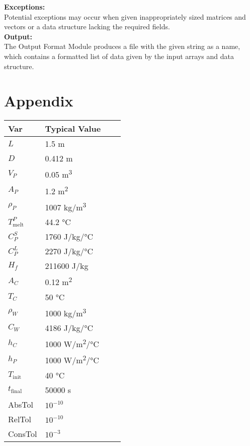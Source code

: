 \documentclass[12pt]{article}
\begin{document}
\noindent \textbf{Exceptions:}\\
Potential exceptions may occur when given inappropriately sized
matrices and vectors or a data structure lacking the required fields.\\

\noindent \textbf{Output:}\\
The Output Format Module produces a file with the given string as a name, which contains a formatted list of data given by the input arrays and data structure.


\section{Appendix}
\begin{table}[!h]
\caption{Standard Input Variables} \label{TblInputVar}
\renewcommand{\arraystretch}{1.2}
\noindent \begin{longtable*}{l l l c} 
  \toprule
  \textbf{Var} & \textbf{Typical Value}\\
  \midrule 
  $L$	& 1.5 \si[per-mode=symbol]	{\metre}
  \\
  $D$	& 0.412 \si[per-mode=symbol] {\metre}	
  \\
  $V_P$ & 0.05 \si[per-mode=symbol] {\cubic\metre}	
  \\
  $A_P$ & 1.2 \si[per-mode=symbol] {\square\metre}	
  \\
  $\rho_P$ & 1007 \si[per-mode=symbol] {\kilogram\per\cubic\metre}
  \\
  $T_\text{melt}^{P}$ &	44.2 \si[per-mode=symbol] {\celsius} 
  \\
  $C_P^S$ & 1760 \si[per-mode=symbol] {\joule\per\kilo\gram\per\celsius}
  \\
  $C_P^L$ & 2270 \si[per-mode=symbol] {\joule\per\kilo\gram\per\celsius} 
  \\
  $H_f$ & 211600 \si[per-mode=symbol] {\joule\per\kilo\gram} & 
  \\
  $A_C$ & 0.12 \si[per-mode=symbol] {\square\metre}
  \\
  $T_C$	& 50 \si[per-mode=symbol] {\celsius}
  \\
  $\rho_W$ & 1000 \si[per-mode=symbol] {\kilo\gram\per\cubic\metre} 
  \\
  $C_W$ & 4186 \si[per-mode=symbol] {\joule\per\kilo\gram\per\celsius}
  \\
  $h_C$ & 1000 \si[per-mode=symbol] {\watt\per\square\metre\per\celsius}
  \\
  $h_P$ & 1000 \si[per-mode=symbol] {\watt\per\square\metre\per\celsius} 
  \\
  $T_\text{init}$ & 40 \si[per-mode=symbol] {\celsius} 
  \\
  $t_\text{final}$ & 50000 \si[per-mode=symbol] {\second} 
  \\
  AbsTol & $10^{-10}$
  \\
  RelTol & $10^{-10}$
  \\
  ConsTol & $10^{-3}$
  \\
  \bottomrule
\end{longtable*}
\end{table}
\end{document}
